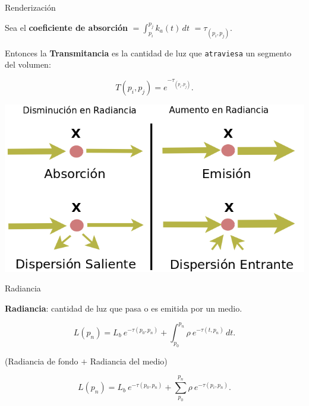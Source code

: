 \documentclass[spanish,unknownkeysallowed]{beamer}
\begin{document}
\begin{frame}{Renderización}


Sea el \textbf{coeficiente de absorción} $ = \int_{p_i}^{p_j} k_a(t) \, dt$  $ = \tau_{(p_i, p_j)}$.


Entonces la \textbf{Transmitancia} es la cantidad de luz que \texttt{atraviesa} un segmento del volumen:

\begin{equation*}
  T(p_i,p_j) = e^{-\tau_{(p_i, p_j)}}.
\end{equation*}


\centerline{\includegraphics[scale = 0.25]{../figures/fenomenosrte}}


\end{frame}

\begin{frame}{Radiancia}


\textbf{Radiancia}: cantidad de luz que pasa o es emitida por un medio.

\begin{equation*}
  L(p_n) = L_b \ e^{-\tau(p_0, p_n)} + \int_{p_0}^{p_n} \rho \ e^{-\tau(t,p_n)} \, dt.
\end{equation*}

(Radiancia de fondo $+$ Radiancia del medio)


\begin{equation*}
  L(p_n) = L_b \ e^{-\tau(p_0, p_n)} + \sum_{p_0}^{p_n} \rho \ e^{-\tau(p_i,p_n)}.
\end{equation*}


\end{frame}
\end{document}
